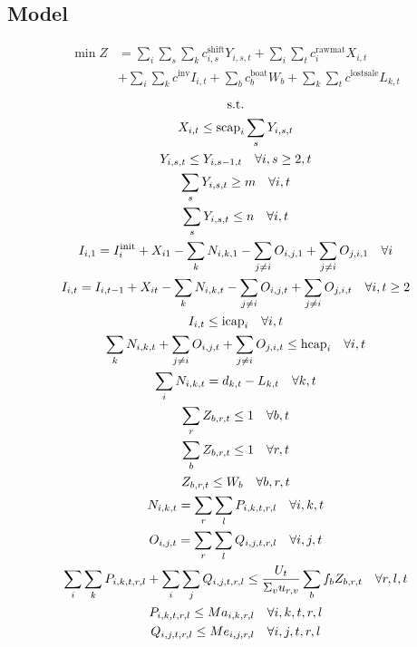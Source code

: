 \documentclass[10pt]{article}
\begin{document}
\subsection{Model}
\begin{align}
    \min Z &= \sum_{i}\sum_s\sum_k c_{i, s}^\text{shift}Y_{i, s, t} + \sum_i\sum_tc_i^\text{rawmat}X_{i, t}\\
    &+\sum_i\sum_kc^\text{inv}I_{i, t} + \sum_bc_b^\text{boat}W_b + \sum_k\sum_tc^\text{lostsale}L_{k, t}
\end{align}
\begin{gather}
    \text{s.t.}\notag\\
    X_{i, t} \le \text{scap}_i\sum_sY_{i, s, t}\\
    Y_{i, s, t} \le Y_{i, s - 1, t}\quad\forall i, s \ge 2, t\\
    \sum_sY_{i, s, t}\ge m\quad\forall i, t\\
    \sum_sY_{i, s, t}\le n \quad\forall i, t\\
    I_{i, 1} = I_i^\text{init} + X_{i1} - \sum_kN_{i, k, 1} - \sum_{j\neq i} O_{i, j, 1} + \sum_{j\neq i} O_{j, i, 1}\quad\forall i\\
    I_{i, t} = I_{i, t - 1} + X_{it} - \sum_kN_{i, k, t} - \sum_{j\neq i} O_{i, j, t} + \sum_{j\neq i} O_{j, i, t}\quad\forall i, t\ge 2 \\
    I_{i, t} \le \text{icap}_i\quad\forall i, t\\
    \sum_kN_{i, k, t} + \sum_{j\neq i} O_{i, j, t} + \sum_{j\neq i}O_{j, i,  t} \le \text{hcap}_i \quad\forall i, t\\
    \sum_i N_{i, k, t} = d_{k, t} - L_{k, t}\quad\forall k, t \\
    \sum_rZ_{b, r, t} \le 1 \quad\forall b, t\\
    \sum_bZ_{b, r, t} \le 1 \quad\forall r, t\\
    Z_{b, r, t} \le W_b\quad\forall b, r, t\\
    N_{i, k, t} = \sum_r\sum_lP_{i, k, t, r, l}\quad\forall i, k, t\\
    O_{i, j, t} = \sum_r\sum_lQ_{i, j, t, r, l}\quad\forall i, j, t\\
    \sum_i\sum_kP_{i, k, t, r, l} + \sum_i\sum_jQ_{i, j, t, r, l}\le \frac{U_t}{\Sigma_vu_{r, v}}\sum_bf_bZ_{b, r, t}\quad\forall r, l, t\\
    P_{i, k, t, r, l}\le Ma_{i, k, r, l}\quad\forall i, k, t, r, l\\
    Q_{i, j, t, r, l}\le Me_{i, j, r, l}\quad\forall i, j, t, r, l
\end{gather}
\newpage
\end{document}
